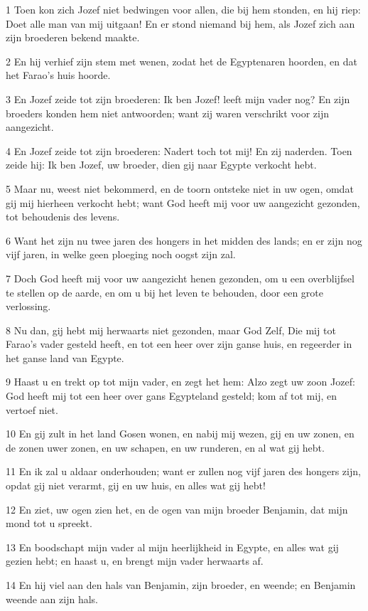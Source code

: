 \par 1 Toen kon zich Jozef niet bedwingen voor allen, die bij hem stonden, en hij riep: Doet alle man van mij uitgaan! En er stond niemand bij hem, als Jozef zich aan zijn broederen bekend maakte.
\par 2 En hij verhief zijn stem met wenen, zodat het de Egyptenaren hoorden, en dat het Farao's huis hoorde.
\par 3 En Jozef zeide tot zijn broederen: Ik ben Jozef! leeft mijn vader nog? En zijn broeders konden hem niet antwoorden; want zij waren verschrikt voor zijn aangezicht.
\par 4 En Jozef zeide tot zijn broederen: Nadert toch tot mij! En zij naderden. Toen zeide hij: Ik ben Jozef, uw broeder, dien gij naar Egypte verkocht hebt.
\par 5 Maar nu, weest niet bekommerd, en de toorn ontsteke niet in uw ogen, omdat gij mij hierheen verkocht hebt; want God heeft mij voor uw aangezicht gezonden, tot behoudenis des levens.
\par 6 Want het zijn nu twee jaren des hongers in het midden des lands; en er zijn nog vijf jaren, in welke geen ploeging noch oogst zijn zal.
\par 7 Doch God heeft mij voor uw aangezicht henen gezonden, om u een overblijfsel te stellen op de aarde, en om u bij het leven te behouden, door een grote verlossing.
\par 8 Nu dan, gij hebt mij herwaarts niet gezonden, maar God Zelf, Die mij tot Farao's vader gesteld heeft, en tot een heer over zijn ganse huis, en regeerder in het ganse land van Egypte.
\par 9 Haast u en trekt op tot mijn vader, en zegt het hem: Alzo zegt uw zoon Jozef: God heeft mij tot een heer over gans Egypteland gesteld; kom af tot mij, en vertoef niet.
\par 10 En gij zult in het land Gosen wonen, en nabij mij wezen, gij en uw zonen, en de zonen uwer zonen, en uw schapen, en uw runderen, en al wat gij hebt.
\par 11 En ik zal u aldaar onderhouden; want er zullen nog vijf jaren des hongers zijn, opdat gij niet verarmt, gij en uw huis, en alles wat gij hebt!
\par 12 En ziet, uw ogen zien het, en de ogen van mijn broeder Benjamin, dat mijn mond tot u spreekt.
\par 13 En boodschapt mijn vader al mijn heerlijkheid in Egypte, en alles wat gij gezien hebt; en haast u, en brengt mijn vader herwaarts af.
\par 14 En hij viel aan den hals van Benjamin, zijn broeder, en weende; en Benjamin weende aan zijn hals.
